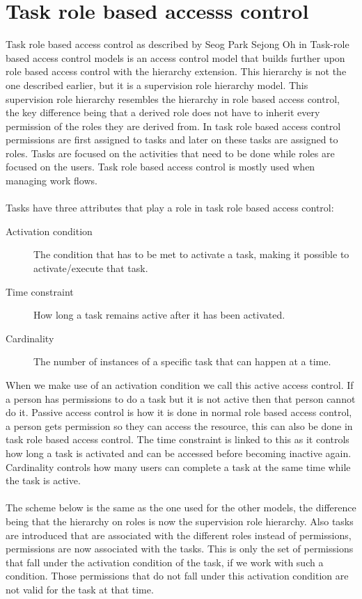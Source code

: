 \clearpage
\section{Task role based accesss control}
Task role based access control as described by Seog Park Sejong Oh in Task-role based access control models\cite{TBRC} is an access control model that builds further upon role based access control with the hierarchy extension.
This hierarchy is not the one described earlier, but it is a supervision role hierarchy model.
This supervision role hierarchy resembles the hierarchy in role based access control, the key difference being that a derived role does not have to inherit every permission of the roles they are derived from. 
In task role based access control permissions are first assigned to tasks and later on these tasks are assigned to roles. 
Tasks are focused on the activities that need to be done while roles are focused on the users.
Task role based access control is mostly used when managing work flows.
\\
\\
Tasks have three attributes that play a role in task role based access control:
\begin{description}
    \item [Activation condition] The condition that has to be met to activate a task, making it possible to activate/execute that task.
    \item [Time constraint] How long a task remains active after it has been activated.
    \item [Cardinality] The number of instances of a specific task that can happen at a time.
\end{description}

 When we make use of an activation condition we call this active access control. 
 If a person has permissions to do a task but it is not active then that person cannot do it.
 Passive access control is how it is done in normal role based access control, a person gets permission so they can access the resource, this can also be done in task role based access control.
 The time constraint is linked to this as it controls how long a task is activated and can be accessed before becoming inactive again.
 Cardinality controls how many users can complete a task at the same time while the task is active.
 \\
 \\
The scheme below is the same as the one used for the other models, the difference being that the hierarchy on roles is now the supervision role hierarchy. 
Also tasks are introduced that are associated with  the different roles instead of permissions, permissions are now associated with the tasks.
This is only the set of permissions that fall under the activation condition of the task, if we work with such a condition.  
Those permissions that do not fall under this activation condition are not valid for the task at that time.

